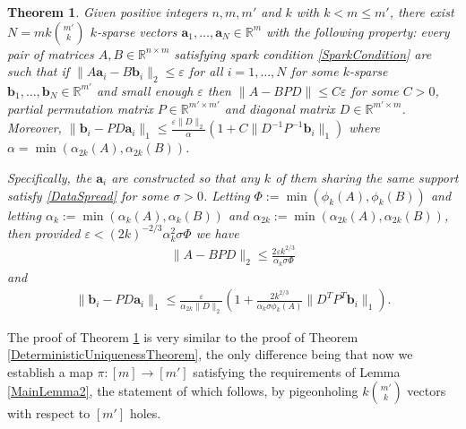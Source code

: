 \documentclass[journal, onecolumn]{IEEEtran}
\newtheorem{theorem}{Theorem}
\begin{document}
\begin{theorem}\label{DeterministicUniquenessTheorem2}
Given positive integers $n, m, m'$ and $k$ with $k < m \leq m'$, there exist $N =  mk{m' \choose k}$ $k$-sparse vectors $\mathbf{a}_1, \ldots, \mathbf{a}_N \in \mathbb{R}^m$ with the following property: every pair of matrices $A, B \in \mathbb{R}^{n \times m}$ satisfying spark condition \eqref{SparkCondition} are such that if $\| A\mathbf{a}_i - B\mathbf{b}_i \|_2 \leq \varepsilon$ for all $i = 1, \ldots, N$ for some $k$-sparse $\mathbf{b}_1, \ldots, \mathbf{b}_N \in \mathbb{R}^{m'}$ and small enough $\varepsilon$ then $\|A - BPD\| \leq C\varepsilon$ for some $C > 0$, partial permutation matrix $P \in \mathbb{R}^{m' \times m'}$ and diagonal matrix $D \in \mathbb{R}^{m' \times m}$. Moreover, $\|\mathbf{b}_i - PD\mathbf{a}_i\|_1 \leq \frac{\varepsilon \|D\|_2}{\alpha}\left( 1 + C\|D^{-1}P^{-1}\mathbf{b}_i\|_1 \right)$ where $\alpha = \min( \alpha_{2k}(A), \alpha_{2k}(B))$.


Specifically, the $\mathbf{a}_i$ are constructed so that any $k$ of them sharing the same support satisfy \eqref{DataSpread} for some $\sigma > 0$. Letting $\Phi := \min(\phi_k(A), \phi_k(B))$ and letting $\alpha_k := \min( \alpha_k(A), \alpha_k(B) )$ and $\alpha_{2k} := \min( \alpha_{2k}(A), \alpha_{2k}(B) )$, then provided $\varepsilon < (2k)^{-2/3}\alpha_k^2\sigma \Phi$ we have
\begin{align}
\|A - BPD\|_2 \leq \frac{2\varepsilon k^{2/3} }{\alpha_k\sigma \Phi}
\end{align}
%
and 
\begin{align}\label{b_PDa}
\|\mathbf{b}_i - PD\mathbf{a}_i\|_1 \leq \frac{\varepsilon}{\alpha_{2k}\|D\|_2}  \left( 1 + \frac{2 k^{2/3}}{\alpha_k\sigma \phi_k(A)}\|D^TP^T\mathbf{b}_i\|_1 \right).
\end{align}
\end{theorem}

The proof of Theorem \ref{DeterministicUniquenessTheorem2} is very similar to the proof of Theorem \ref{DeterministicUniquenessTheorem}, the only difference being that now we establish a map $\pi: [m] \to [m']$ satisfying the requirements of Lemma \ref{MainLemma2}, the statement of which follows, by pigeonholing $k{m' \choose k}$ vectors with respect to $[m']$ holes.
\end{document}

